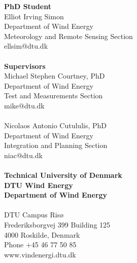 \thispagestyle{empty} %
\frieze
\vspace*{\fill}
\noindent
\sffamily
\small
\textbf{PhD Student}\\
Elliot Irving Simon\\
Department of Wind Energy\\
Meteorology and Remote Sensing Section\\
ellsim@dtu.dk\\
\\
\textbf{Supervisors}\\
Michael Stephen Courtney, PhD\\
Department of Wind Energy\\
Test and Measurements Section\\
mike@dtu.dk\\
\\
Nicolaos Antonio Cutululis, PhD\\
Department of Wind Energy\\
Integration and Planning Section\\
niac@dtu.dk\\
\\
\textbf{Technical University of Denmark}\\
\textbf{DTU Wind Energy}\\
\textbf{Department of Wind Energy}\\
\\
DTU Campus Ris{\o}\\
Frederiksborgvej 399
Building 125\\
4000 Roskilde, Denmark\\
Phone +45 46 77 50 85\\
www.vindenergi.dtu.dk\\
\normalsize
\normalfont
\vspace*{2.5cm}